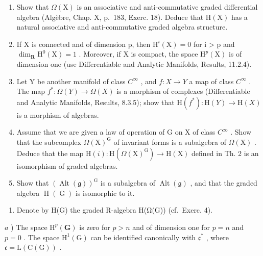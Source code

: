 \begin{enumerate}
\begin{enumerate}
\def\labelenumi{\alph{enumi})}
\item
  Show that \(\Omega(\mathrm{X})\) is an associative and anti-commutative graded differential algebra (Algèbre, Chap. X, p.~183, Exerc. 18). Deduce that \(\mathrm{H}(\mathrm{X})\) has a natural associative and anti-commutative graded algebra structure.
\item
  If X is connected and of dimension p, then \(\mathrm{H}^{i}(\mathrm{X}) = 0\) for i \textgreater{} p and \(\dim_{\mathbf{R}} \mathrm{H}^{0}(\mathrm{X}) = 1\) . Moreover, if X is compact, the space \(\mathrm{H}^{p}(\mathrm{X})\) is of dimension one (use Differentiable and Analytic Manifolds, Results, 11.2.4).
\item
  Let Y be another manifold of class \(C^{\infty}\) , and \(f: X \to Y\) a map of class \(C^{\infty}\) . The map \(f^{*}: \Omega(Y) \to \Omega(X)\) is a morphism of complexes (Differentiable and Analytic Manifolds, Results, 8.3.5); show that \(\mathrm{H}(f^{*}) : \mathrm{H}(Y) \to \mathrm{H}(X)\) is a morphism of algebras.
\item
  Assume that we are given a law of operation of G on X of class \(C^{\infty}\) . Show that the subcomplex \(\Omega(\mathrm{X})^{\mathrm{G}}\) of invariant forms is a subalgebra of \(\Omega(\mathrm{X})\) . Deduce that the map \(\mathrm{H}(i):\mathrm{H}(\Omega(\mathrm{X})^{\mathrm{G}})\to\mathrm{H}(\mathrm{X})\) defined in Th. 2 is an isomorphism of graded algebras.
\item
  Show that \((\operatorname{Alt}(\mathfrak{g}))^{\mathrm{G}}\) is a subalgebra of \(\operatorname{Alt}(\mathfrak{g})\) , and that the graded algebra \(\operatorname{H}(\operatorname{G})\) is isomorphic to it.
\end{enumerate}

\begin{enumerate}
\def\labelenumi{\arabic{enumi})}
\setcounter{enumi}{4}
\tightlist
\item
  Denote by H(G) the graded R-algebra H(Ω(G)) (cf.~Exerc. 4).
\end{enumerate}

\(a\) ) The space \(\mathrm{H}^p (\mathbf{G})\) is zero for \(p > n\) and of dimension one for \(p = n\) and \(p = 0\) . The space \(\mathrm{H}^1 (\mathrm{G})\) can be identified canonically with \(\mathfrak{c}^*\) , where \(\mathfrak{c} = \mathrm{L}(\mathrm{C}(\mathrm{G}))\) .


\end{enumerate}
